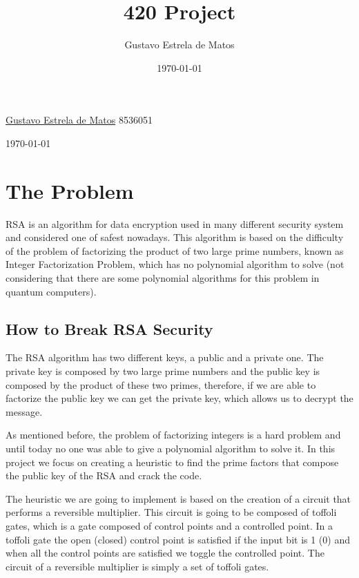 \documentclass[12pt]{article}
\title{420 Project}
\author{Gustavo Estrela de Matos}
\date{\today}
\begin{document}
\begin{titlepage}
\begin{center}
    \begin{flushleft}
        \textcolor{title_color} {
            \fontsize{1cm}{1em}\selectfont {Breaking the RSA with Reversible Multiplier Circuits\\}
        }
    \end{flushleft}
  
    \begin{flushleft}{
        \textcolor{text_color} {
        \href{mailto:estrela.gustavo.matos@gmail.com}{Gustavo Estrela de Matos} 8536051\\}
    }
    \end{flushleft}
    \today
\end{center}
\end{titlepage}

\newpage
\section{The Problem}
RSA is an algorithm for data encryption used in many different security system and considered one of safest nowadays. This algorithm is based on the difficulty of the problem of factorizing the product of two large prime numbers, known as Integer Factorization Problem, which has no polynomial algorithm to solve (not considering that there are some polynomial algorithms for this problem in quantum computers).

\subsection{How to Break RSA Security}
The RSA algorithm has two different keys, a public and a private one. The private key is composed by two large prime numbers and the public key is composed by the product of these two primes, therefore, if we are able to factorize the public key we can get the private key,  which allows us to decrypt the message.

As mentioned before, the problem of factorizing integers is a hard problem and until today no one was able to give a polynomial algorithm to solve it. In this project we focus on creating a heuristic to find the prime factors that compose the public key of the RSA and crack the code.

The heuristic we are going to implement is based on the creation of a circuit that performs a reversible multiplier. This circuit is going to be composed of toffoli gates, which is a gate composed of control points and a controlled point. In a toffoli gate the open (closed) control point is satisfied if the input bit is 1 (0) and when all the control points are satisfied we toggle the controlled point. The circuit of a reversible multiplier is simply a set of toffoli gates.
\end{document}
